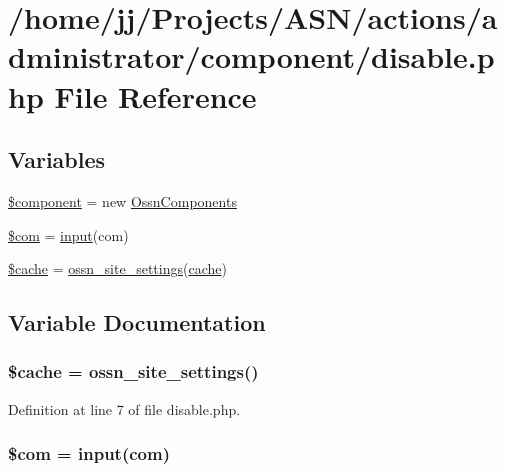 \hypertarget{disable_8php}{}\section{/home/jj/\+Projects/\+A\+S\+N/actions/administrator/component/disable.php File Reference}
\label{disable_8php}
\subsection*{Variables}
\begin{DoxyCompactItemize}
\item 
\hyperlink{disable_8php_a211527c21ba56109545060b49b628e59}{\$component} = new \hyperlink{class_ossn_components}{Ossn\+Components}
\item 
\hyperlink{disable_8php_aeb238dc1f5c0181fea3117fd9ba0429f}{\$com} = \hyperlink{ossn_8lib_8input_8php_a64ebee98b041c4f75f71ed3cd73cc8ed}{input}(\textquotesingle{}com\textquotesingle{})
\item 
\hyperlink{disable_8php_ac2dc76d756ec398393d4b1d23659276c}{\$cache} = \hyperlink{ossn_8lib_8system_8php_a610e2045b8a86c09f777b4d82e24e34c}{ossn\+\_\+site\+\_\+settings}(\textquotesingle{}\hyperlink{jquery_8tokeninput_8js_a521016aa0ca9ff38bfba60ab069cb34b}{cache}\textquotesingle{})
\end{DoxyCompactItemize}


\subsection{Variable Documentation}
\subsubsection[{\texorpdfstring{\$cache}{$cache}}]{\setlength{\rightskip}{0pt plus 5cm}\${\bf cache} = {\bf ossn\+\_\+site\+\_\+settings}(\textquotesingle{})}\hypertarget{disable_8php_ac2dc76d756ec398393d4b1d23659276c}{}\label{disable_8php_ac2dc76d756ec398393d4b1d23659276c}


Definition at line 7 of file disable.\+php.

\subsubsection[{\texorpdfstring{\$com}{$com}}]{\setlength{\rightskip}{0pt plus 5cm}\$com = {\bf input}(\textquotesingle{}com\textquotesingle{})}\hypertarget{disable_8php_aeb238dc1f5c0181fea3117fd9ba0429f}{}\label{disable_8php_aeb238dc1f5c0181fea3117fd9ba0429f}


